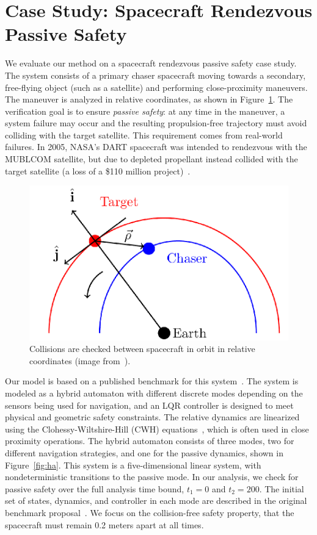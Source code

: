 \section{Case Study: Spacecraft Rendezvous Passive Safety}
\label{sec:casestudy}

We evaluate our method on a spacecraft rendezvous passive safety case study. The system consists of a primary chaser spacecraft moving towards a secondary, free-flying object (such as a satellite) and performing close-proximity maneuvers.
%
The maneuver is analyzed in relative coordinates, as shown in Figure~\ref{fig:chaser}.
%
The verification goal is to ensure \emph{passive safety}: at any time in the maneuver, a system failure may occur and the resulting propulsion-free trajectory must avoid colliding with the target satellite.
%
This requirement comes from real-world failures. In 2005, NASA’s DART spacecraft was intended to rendezvous with the MUBLCOM satellite, but due to depleted propellant instead collided with the target satellite (a loss of a
\$110 million project)~\cite{croomes2006overview}.

\begin{figure}[t]
\centerline{\includegraphics[width=0.5\columnwidth]{images/chaser.png}}
\caption{Collisions are checked between spacecraft in orbit in relative coordinates (image from~\cite{chan2017verifying}).}
\label{fig:chaser}
\end{figure}


Our model is based on a published benchmark for this system~\cite{chan2017verifying,jewison2016spacecraft}. The system is modeled as a hybrid automaton with different discrete modes depending on the sensors being used for navigation, and an LQR controller is designed to meet physical and geometric safety constraints.
%
The relative dynamics are linearized using the Clohessy-Wiltshire-Hill (CWH) equations~\cite{wh1960terminal}, which is often used in close proximity operations. The hybrid automaton consists of three modes, two for different navigation strategies, and one for the passive dynamics, shown in Figure~\ref{fig:ha}.
%
This system is a five-dimensional linear system, with nondeterministic transitions to the passive mode.
%
In our analysis, we check for passive safety over the full analysis time bound, $t_1=0$ and $t_2=200$.
%
The initial set of states, dynamics, and controller in each mode are described in the original benchmark proposal~\cite{chan2017verifying}.
%
We focus on the collision-free safety property, that the spacecraft must remain 0.2 meters apart at all times.

